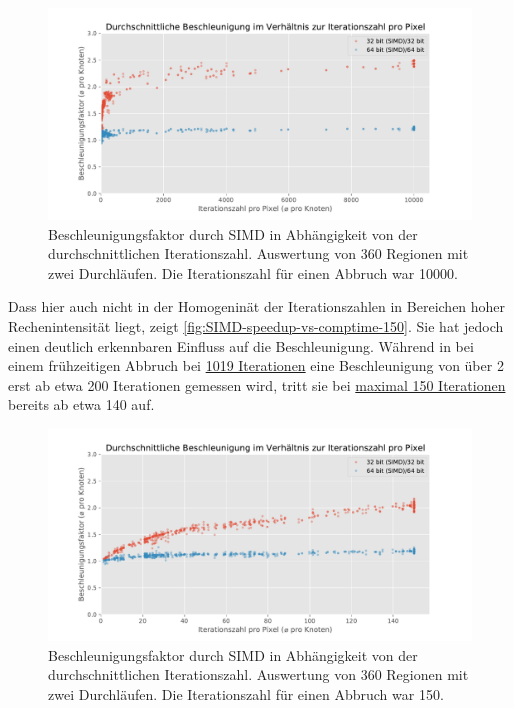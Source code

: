 \begin{figure}
	\centering
	\includegraphics[width=0.9\linewidth]{img/Evaluation/simd/speedup10000.pdf}
	\caption{Beschleunigungsfaktor durch SIMD in Abhängigkeit von der durchschnittlichen Iterationszahl. Auswertung von 360 Regionen mit zwei Durchläufen. Die Iterationszahl für einen Abbruch war 10000.}
	\label{fig:SIMD-speedup-vs-comptime-10000}
\end{figure}

Dass hier auch nicht in der Homogeninät der Iterationszahlen in Bereichen hoher Rechenintensität liegt,
zeigt \autoref{fig:SIMD-speedup-vs-comptime-150}.
Sie hat jedoch einen deutlich erkennbaren Einfluss auf die Beschleunigung.
Während in bei einem frühzeitigen Abbruch bei \hyperref[fig:SIMD-speedup-vs-comptime]{1019 Iterationen} eine Beschleunigung von über 2
erst ab etwa 200 Iterationen gemessen wird, tritt sie bei \hyperref[fig:SIMD-speedup-vs-comptime-150]{maximal 150 Iterationen} bereits ab etwa 140 auf.

\begin{figure}
	\centering
	\includegraphics[width=0.9\linewidth]{img/Evaluation/simd/speedup150.pdf}
	\caption{Beschleunigungsfaktor durch SIMD in Abhängigkeit von der durchschnittlichen Iterationszahl. Auswertung von 360 Regionen mit zwei Durchläufen. Die Iterationszahl für einen Abbruch war 150.}
	\label{fig:SIMD-speedup-vs-comptime-150}
\end{figure}

